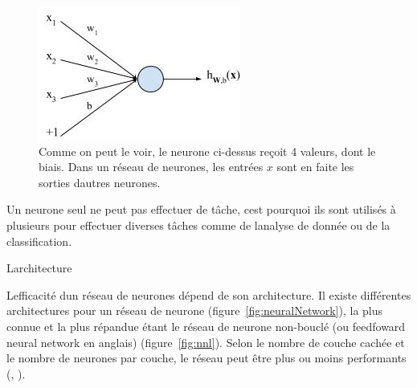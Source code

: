 \documentclass[11pt]{sdm}
\begin{document}
			\begin{figure}[!ht]
				\centering
				\includegraphics[scale=0.7,natwidth=251,natheight=166]{figures/neural.png}
				\caption{Comme on peut le voir, le neurone ci-dessus re\c coit 4 valeurs, dont le biais. Dans un r\'eseau de neurones, les entr\'ees $x$ sont en faite les sorties d\textquotesingle autres neurones.}
				\label{fig:neural}
			\end{figure}

			Un neurone seul ne peut pas effectuer de t\^ache, c\textquotesingle est pourquoi ils sont utilis\'es \`a plusieurs pour effectuer diverses t\^aches comme de l\textquotesingle analyse de donn\'ee ou de la classification.	

			\medbreak
			\begin{itshape}L\textquotesingle architecture\end{itshape}
			\smallbreak
			L\textquotesingle efficacit\'e d\textquotesingle un r\'eseau de neurones d\'epend de son architecture.
			Il existe diff\'erentes architectures pour un r\'eseau de neurone (figure~\ref{fig:neuralNetwork}), la plus connue et la plus r\'epandue \'etant le r\'eseau de neurone non-boucl\'e (ou feedfoward neural network en anglais) (figure~\ref{fig:nnl}). Selon le nombre de couche cach\'ee et le nombre de neurones par couche, le r\'eseau peut \^etre plus ou moins performants (\cite{chatfield2014return}, \cite{srivastava2014dropout}). 
\end{document}
